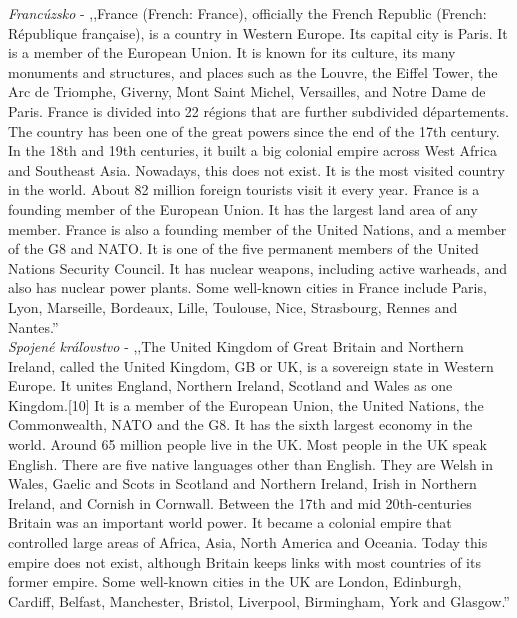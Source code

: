 \noindent
\textit{Francúzsko} - ,,France (French: France), officially the French Republic (French: République française), is a country in Western Europe. Its capital city is Paris. It is a member of the European Union. It is known for its culture, its many monuments and structures, and places such as the Louvre, the Eiffel Tower, the Arc de Triomphe, Giverny, Mont Saint Michel, Versailles, and Notre Dame de Paris. France is divided into 22 régions that are further subdivided départements. The country has been one of the great powers since the end of the 17th century. In the 18th and 19th centuries, it built a big colonial empire across West Africa and Southeast Asia. Nowadays, this does not exist. It is the most visited country in the world. About 82 million foreign tourists visit it every year. France is a founding member of the European Union. It has the largest land area of any member. France is also a founding member of the United Nations, and a member of the G8 and NATO. It is one of the five permanent members of the United Nations Security Council. It has nuclear weapons, including active warheads, and also has nuclear power plants. Some well-known cities in France include Paris, Lyon, Marseille, Bordeaux, Lille, Toulouse, Nice, Strasbourg, Rennes and Nantes.'' \\

\noindent
\textit{Spojené kráľovstvo} - ,,The United Kingdom of Great Britain and Northern Ireland, called the United Kingdom, GB or UK, is a sovereign state in Western Europe. It unites England, Northern Ireland, Scotland and Wales as one Kingdom.[10] It is a member of the European Union, the United Nations, the Commonwealth, NATO and the G8. It has the sixth largest economy in the world. Around 65 million people live in the UK. Most people in the UK speak English. There are five native languages other than English. They are Welsh in Wales, Gaelic and Scots in Scotland and Northern Ireland, Irish in Northern Ireland, and Cornish in Cornwall. Between the 17th and mid 20th-centuries Britain was an important world power. It became a colonial empire that controlled large areas of Africa, Asia, North America and Oceania. Today this empire does not exist, although Britain keeps links with most countries of its former empire. Some well-known cities in the UK are London, Edinburgh, Cardiff, Belfast, Manchester, Bristol, Liverpool, Birmingham, York and Glasgow.'' \\

